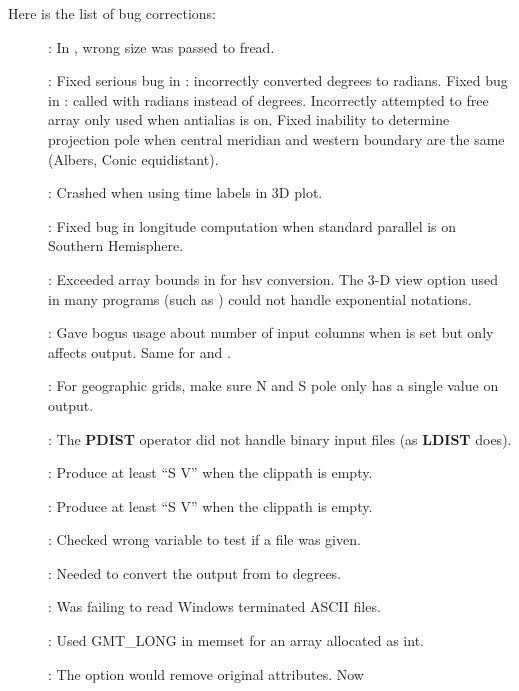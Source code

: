 Here is the list of bug corrections:
\begin{description}
	\item []: In , wrong size was passed to fread.
	\item []: Fixed serious bug in : incorrectly
	converted degrees to radians. Fixed bug in : called  with radians instead of degrees.
	Incorrectly attempted to free array only used when antialias is on.
	Fixed inability to determine projection pole when central meridian and western boundary are the same (Albers, Conic equidistant).
	\item []: Crashed when using time labels in 3D plot.
	\item []: Fixed bug in longitude computation when standard parallel is on Southern Hemisphere.
	\item []: Exceeded array bounds in  for hsv conversion.
		The 3-D view  option used in many programs (such as ) could not handle exponential notations.
	\item []: Gave bogus usage about number of input columns when  is set
		but  only affects output.  Same for   and .
		\item []: For geographic grids, make sure N and S pole only has a single value on output.
		\item []: The {\bf PDIST} operator did not handle binary input files (as {\bf LDIST} does).
		\item []: Produce at least ``S V'' when the clippath is empty.
		\item []: Produce at least ``S V'' when the clippath is empty.
	\item []: Checked wrong variable to test if a file was given.
	\item []: Needed to convert the output from  to degrees.
	\item []: Was failing to read Windows terminated ASCII files.
	\item []: Used GMT\_LONG in memset for an array allocated as int.
	\item []: The  option would remove original attributes.  Now

\end{description}
